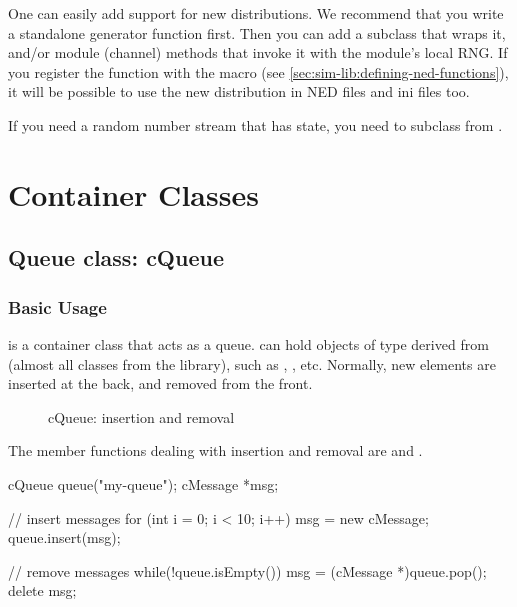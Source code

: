 One can easily add support for new distributions. We recommend that
you write a standalone generator function first. Then you can add
a  subclass that wraps it, and/or module (channel)
methods that invoke it with the module's local RNG.
If you register the function with the 
macro (see \ref{sec:sim-lib:defining-ned-functions}), it will be
possible to use the new distribution in NED files and ini files too.

If you need a random number stream that has state, you need to
subclass from .


\section{Container Classes}
\label{sec:sim-lib:container-classes}

\subsection{Queue class: cQueue}
\label{sec:sim-lib:cqueue}

\subsubsection{Basic Usage}
\label{sec:sim-lib:cqueue-basic-usage}

 is a container class that acts as a queue.
 can hold objects of type derived from 
(almost all classes from the {\opp} library), such as
, , etc. Normally, new elements
are inserted at the back, and removed from the front.

\begin{figure}[htbp]
  \begin{center}
    
    \caption{cQueue: insertion and removal}
    \label{fig:ch-sim-lib:cqueue}
  \end{center}
\end{figure}

The member functions dealing with insertion and removal are
 and .

\begin{cpp}
cQueue queue("my-queue");
cMessage *msg;

// insert messages
for (int i = 0; i < 10; i++) {
    msg = new cMessage;
    queue.insert(msg);
}

// remove messages
while(!queue.isEmpty()) {
    msg = (cMessage *)queue.pop();
    delete msg;
}
\end{cpp}

